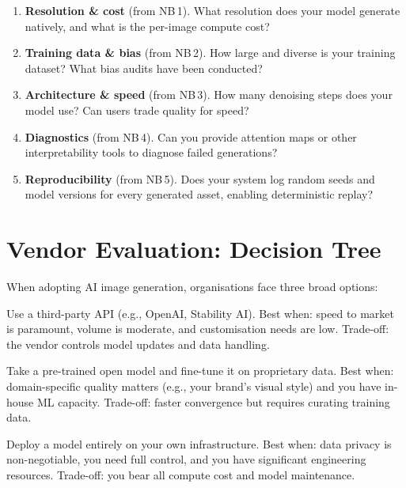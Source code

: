 \documentclass[11pt,a4paper]{article}
\begin{document}
\begin{enumerate}
  \item \textbf{Resolution \& cost} (from NB\,1).  What resolution does
        your model generate natively, and what is the per-image compute
        cost?
  \item \textbf{Training data \& bias} (from NB\,2).  How large and
        diverse is your training dataset?  What bias audits have been
        conducted?
  \item \textbf{Architecture \& speed} (from NB\,3).  How many denoising
        steps does your model use?  Can users trade quality for speed?
  \item \textbf{Diagnostics} (from NB\,4).  Can you provide attention
        maps or other interpretability tools to diagnose failed
        generations?
  \item \textbf{Reproducibility} (from NB\,5).  Does your system log
        random seeds and model versions for every generated asset,
        enabling deterministic replay?
\end{enumerate}


\section{Vendor Evaluation: Decision Tree}
\label{sec:decision}

When adopting AI image generation, organisations face three broad
options:

\begin{description}[style=nextline, leftmargin=1.5cm]
  \item[API Service] Use a third-party API (e.g., OpenAI, Stability AI).
    Best when: speed to market is paramount, volume is moderate, and
    customisation needs are low.  Trade-off: the vendor controls model
    updates and data handling.
  \item[Fine-Tuned Model] Take a pre-trained open model and fine-tune it
    on proprietary data.  Best when: domain-specific quality matters
    (e.g., your brand's visual style) and you have in-house ML capacity.
    Trade-off: faster convergence but requires curating training data.
  \item[Self-Hosted Model] Deploy a model entirely on your own
    infrastructure.  Best when: data privacy is non-negotiable, you need
    full control, and you have significant engineering resources.
    Trade-off: you bear all compute cost and model maintenance.
\end{description}
\end{document}
